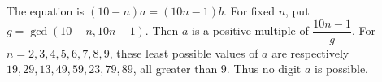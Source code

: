 The equation is $(10-n)a=(10n-1)b$. For fixed $n$, put $g=\gcd(10-n,10n-1)$. Then $a$ is a positive multiple of $\dfrac{10n-1}{g}$. For $n=2,3,4,5,6,7,8,9$, these least possible values of $a$ are respectively $19,29,13,49,59,23,79,89$, all greater than $9$. Thus no digit $a$ is possible.
